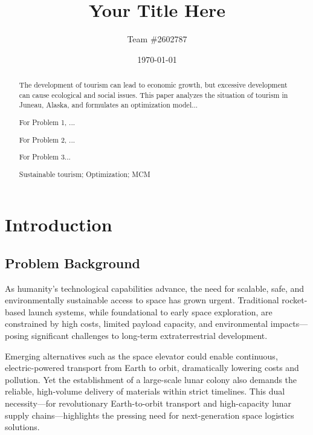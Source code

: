 \documentclass{mcmthesis}
\title{Your Title Here}
\author{Team \#2602787}
\date{\today}
\begin{document}
\begin{abstract}
    The development of tourism can lead to economic growth, but excessive development can cause ecological and social issues. This paper analyzes the situation of tourism in Juneau, Alaska, and formulates an optimization model...

    For Problem 1, ...

    For Problem 2, ...

    For Problem 3...

    \begin{keywords}
        Sustainable tourism; Optimization; MCM
    \end{keywords}
\end{abstract}

\maketitle

\tableofcontents
\newpage

\section{Introduction}

\subsection{Problem Background}

As humanity’s technological capabilities advance, the need for scalable, safe, and environmentally sustainable access to space has grown urgent. Traditional rocket-based launch systems, while foundational to early space exploration, are constrained by high costs, limited payload capacity, and environmental impacts—posing significant challenges to long-term extraterrestrial development.

Emerging alternatives such as the space elevator could enable continuous, electric-powered transport from Earth to orbit, dramatically lowering costs and pollution. Yet the establishment of a large-scale lunar colony also demands the reliable, high-volume delivery of materials within strict timelines. This dual necessity—for revolutionary Earth-to-orbit transport and high-capacity lunar supply chains—highlights the pressing need for next-generation space logistics solutions.
\end{document}
